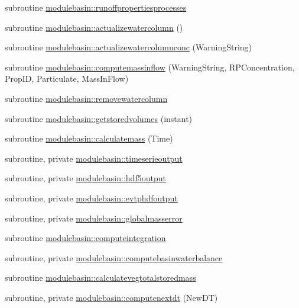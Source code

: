 \begin{DoxyCompactItemize}
\item 
subroutine \mbox{\hyperlink{namespacemodulebasin_a0d5f24ad034e1da333cb8086aba4bf1f}{modulebasin\+::runoffpropertiesprocesses}}
\item 
subroutine \mbox{\hyperlink{namespacemodulebasin_a6b7803a58ac882de2847f5af4c47cf02}{modulebasin\+::actualizewatercolumn}} ()
\item 
subroutine \mbox{\hyperlink{namespacemodulebasin_a3ad94088588cc4ac448ba73dc73a3f61}{modulebasin\+::actualizewatercolumnconc}} (Warning\+String)
\item 
subroutine \mbox{\hyperlink{namespacemodulebasin_a106653309e017391895ef068b14bfdc2}{modulebasin\+::computemassinflow}} (Warning\+String, R\+P\+Concentration, Prop\+ID, Particulate, Mass\+In\+Flow)
\item 
subroutine \mbox{\hyperlink{namespacemodulebasin_a2c7426bfbfa1e3a2540f18b8e04ec4b5}{modulebasin\+::removewatercolumn}}
\item 
subroutine \mbox{\hyperlink{namespacemodulebasin_a51eb37f44f2fb4685ca3ed3454156732}{modulebasin\+::getstoredvolumes}} (instant)
\item 
subroutine \mbox{\hyperlink{namespacemodulebasin_af1427c4ade7156552be2283259050d1d}{modulebasin\+::calculatemass}} (Time)
\item 
subroutine, private \mbox{\hyperlink{namespacemodulebasin_a5d090cabe217c5ee21e1b627217a129f}{modulebasin\+::timeserieoutput}}
\item 
subroutine, private \mbox{\hyperlink{namespacemodulebasin_a728974f3cdc06d12227aa4b65b29b574}{modulebasin\+::hdf5output}}
\item 
subroutine, private \mbox{\hyperlink{namespacemodulebasin_ac386c2a8b57550077a00db68e3c300ab}{modulebasin\+::evtphdfoutput}}
\item 
subroutine, private \mbox{\hyperlink{namespacemodulebasin_ac258b876198ebb36e6bb2b0fd0399158}{modulebasin\+::globalmasserror}}
\item 
subroutine \mbox{\hyperlink{namespacemodulebasin_a9ef4a0de552e03dfcc7dc780e6162af7}{modulebasin\+::computeintegration}}
\item 
subroutine, private \mbox{\hyperlink{namespacemodulebasin_ad852fa9f51f06a8aad01fbf81cfd7015}{modulebasin\+::computebasinwaterbalance}}
\item 
subroutine \mbox{\hyperlink{namespacemodulebasin_a00fd3009ac96d7478c5ad365f4438954}{modulebasin\+::calculatevegtotalstoredmass}}
\item 
subroutine, private \mbox{\hyperlink{namespacemodulebasin_a3f14e909944d51caacaf3104b755d817}{modulebasin\+::computenextdt}} (New\+DT)

\end{DoxyCompactItemize}
